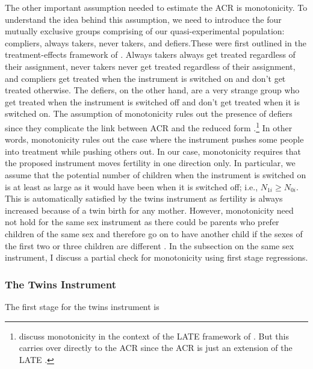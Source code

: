 The other important assumption needed to estimate the ACR is monotonicity. To understand the idea behind this assumption, we need to introduce the four mutually exclusive groups comprising of our quasi-experimental population: compliers, always takers, never takers, and defiers.These were first outlined in the treatment-effects framework of \cite{angrist_identification_1996}.  Always takers always get treated regardless of their assignment, never takers never get treated regardless of their assignment, and compliers get treated when the instrument is switched on and don't get treated otherwise. The defiers, on the other hand, are a very strange group who get treated when the instrument is switched off and don't get treated when it is switched on. The assumption of monotonicity rules out the presence of defiers since they complicate the link between ACR and the reduced form \parencite{Angrist2009}.\footnote{\cite{Angrist2009} discuss monotonicity in the context of the LATE framework of \cite{imbens_identification_1994}. But this carries over directly to the ACR since the ACR is just an extension of the LATE \parencite[see][p.~181]{Angrist2009}.}  In other words, monotonicity rules out the case where the instrument pushes some people into treatment while pushing others out. In our case, monotonicity requires that the proposed instrument moves fertility in one direction only. In particular, we assume that the potential number of children when the instrument is switched on is at least as large as it would have been when it is switched off; i.e., $ N_{1i} \geq N_{0i} $. This is automatically satisfied by the twins instrument as fertility is always increased because of a twin birth for any mother. However, monotonicity need not hold for the same sex instrument as there could be parents who prefer children of the same sex and therefore go on to have another child if the sexes of the first two or three children are different \parencite{Huber2015}. In the subsection on the same sex instrument, I discuss a partial check for monotonicity using first stage regressions. 










\subsubsection*{The Twins Instrument}

The first stage for the twins instrument is

